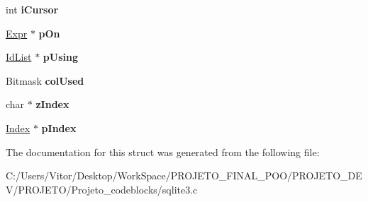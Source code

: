 \begin{DoxyCompactItemize}
\item 
\hypertarget{struct_src_list_1_1_src_list__item_af2e8aae90bd7a00b814db5a2d31f6607}{int {\bfseries i\-Cursor}}\label{struct_src_list_1_1_src_list__item_af2e8aae90bd7a00b814db5a2d31f6607}

\item 
\hypertarget{struct_src_list_1_1_src_list__item_a525f683af2ffa8f094d941a5a4972720}{\hyperlink{struct_expr}{Expr} $\ast$ {\bfseries p\-On}}\label{struct_src_list_1_1_src_list__item_a525f683af2ffa8f094d941a5a4972720}

\item 
\hypertarget{struct_src_list_1_1_src_list__item_a38ecf205dcaebad098b73c56e48ba944}{\hyperlink{struct_id_list}{Id\-List} $\ast$ {\bfseries p\-Using}}\label{struct_src_list_1_1_src_list__item_a38ecf205dcaebad098b73c56e48ba944}

\item 
\hypertarget{struct_src_list_1_1_src_list__item_a4fd7e7e26995048b58006d020e8c48d6}{Bitmask {\bfseries col\-Used}}\label{struct_src_list_1_1_src_list__item_a4fd7e7e26995048b58006d020e8c48d6}

\item 
\hypertarget{struct_src_list_1_1_src_list__item_a72b8e117712e49607b770a462fb42d95}{char $\ast$ {\bfseries z\-Index}}\label{struct_src_list_1_1_src_list__item_a72b8e117712e49607b770a462fb42d95}

\item 
\hypertarget{struct_src_list_1_1_src_list__item_ab4722e97bd4852c8b84e620185955c28}{\hyperlink{struct_index}{Index} $\ast$ {\bfseries p\-Index}}\label{struct_src_list_1_1_src_list__item_ab4722e97bd4852c8b84e620185955c28}

\end{DoxyCompactItemize}


The documentation for this struct was generated from the following file\-:\begin{DoxyCompactItemize}
\item 
C\-:/\-Users/\-Vitor/\-Desktop/\-Work\-Space/\-P\-R\-O\-J\-E\-T\-O\-\_\-\-F\-I\-N\-A\-L\-\_\-\-P\-O\-O/\-P\-R\-O\-J\-E\-T\-O\-\_\-\-D\-E\-V/\-P\-R\-O\-J\-E\-T\-O/\-Projeto\-\_\-codeblocks/sqlite3.\-c\end{DoxyCompactItemize}
